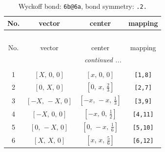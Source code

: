 \documentclass[fleqn,8pt]{jsarticle}
\begin{document}
\begin{longtable}{cccc}
\caption{Wyckoff bond: {\tt 6b@6a}, bond symmetry: {\tt .2.}}
 \\
 \hline \hline
No. & vector & center & mapping \\ \hline \endfirsthead

\multicolumn{3}{l}{\tablename\ \thetable{}} \\
 \hline \hline
No. & vector & center & mapping \\ \hline \endhead

 \hline \hline
\multicolumn{3}{r}{\footnotesize\it continued ...} \\ \endfoot

 \hline \hline
\multicolumn{3}{r}{} \\ \endlastfoot

1 & $\left[ X,\, 0,\, 0 \right]$ & $\left[ x,\, 0,\, 0 \right]$ & {\tt [1,8]} \\ \hline
2 & $\left[ 0,\, X,\, 0 \right]$ & $\left[ 0,\, x,\, \frac{2}{3} \right]$ & {\tt [2,7]} \\ \hline
3 & $\left[ - X,\, - X,\, 0 \right]$ & $\left[ - x,\, - x,\, \frac{1}{3} \right]$ & {\tt [3,9]} \\ \hline
4 & $\left[ - X,\, 0,\, 0 \right]$ & $\left[ - x,\, 0,\, \frac{1}{2} \right]$ & {\tt [4,11]} \\ \hline
5 & $\left[ 0,\, - X,\, 0 \right]$ & $\left[ 0,\, - x,\, \frac{1}{6} \right]$ & {\tt [5,10]} \\ \hline
6 & $\left[ X,\, X,\, 0 \right]$ & $\left[ x,\, x,\, \frac{5}{6} \right]$ & {\tt [6,12]} \\
\end{longtable}
\renewcommand{\arraystretch}{1.2}
\end{document}
